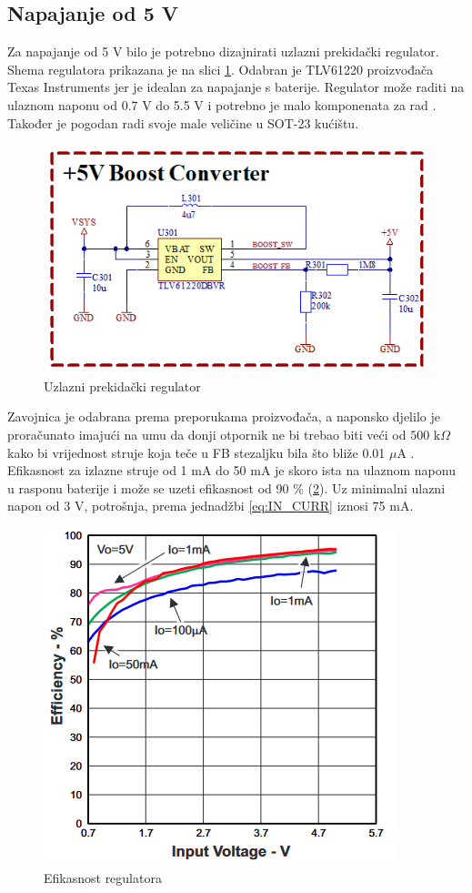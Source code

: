 \subsection{Napajanje od 5 V}

Za napajanje od 5 V bilo je potrebno dizajnirati uzlazni prekidački regulator. Shema regulatora prikazana je na slici \ref{slk:BR_BOOST}. Odabran je TLV61220 proizvođača Texas Instruments jer je idealan za napajanje s baterije. Regulator može raditi na ulaznom naponu od 0.7 V do 5.5 V i potrebno je malo komponenata za rad \cite{ti:tlv61220}. Također je pogodan radi svoje male veličine u SOT-23 kućištu.
\begin{figure}[htb]
    \centering
    \includegraphics[width=10 cm]{Figures/BR_BOOST.png}
    \caption{Uzlazni prekidački regulator}
    \label{slk:BR_BOOST}
\end{figure}
Zavojnica je odabrana prema preporukama proizvođača, a naponsko djelilo je proračunato imajući na umu da donji otpornik ne bi trebao biti veći od $500\textrm{ k}\Omega$ kako bi vrijednost struje koja teče u FB stezaljku bila što bliže 0.01 $\mu\textrm{A}$ \cite{ti:tlv61220}. Efikasnost za izlazne struje od 1 mA do 50 mA je skoro ista na ulaznom naponu u rasponu baterije i može se uzeti efikasnost od 90 \% (\ref{slk:BOOST_EFF}). Uz minimalni ulazni napon od 3 V, potrošnja, prema jednadžbi \ref{eq:IN_CURR} iznosi 75 mA.
\begin{figure}[H]
    \centering
    \includegraphics[width=6 cm]{Figures/BOOST_EFF.png}
    \caption{Efikasnost regulatora \cite{ti:tlv61220}}
    \label{slk:BOOST_EFF}
\end{figure}

